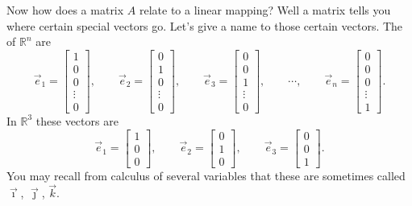 Now how does a matrix $A$ relate to a linear mapping?
Well a matrix tells you where
certain special vectors go.  Let's give a name to those certain vectors.
The \emph{} of ${\mathbb R}^n$ are
\begin{equation*}
\vec{e}_1 =
\begin{bmatrix}
1 \\ 0 \\ 0 \\ \vdots \\ 0
\end{bmatrix} ,
\qquad
\vec{e}_2 =
\begin{bmatrix}
0 \\ 1 \\ 0 \\ \vdots \\ 0
\end{bmatrix} ,
\qquad
\vec{e}_3 =
\begin{bmatrix}
0 \\ 0 \\ 1 \\ \vdots \\ 0
\end{bmatrix} ,
\qquad
\cdots ,
\qquad
\vec{e}_n =
\begin{bmatrix}
0 \\ 0 \\ 0 \\ \vdots \\ 1
\end{bmatrix} .
\end{equation*}
In ${\mathbb R}^3$ these vectors are
\begin{equation*}
\vec{e}_1 =
\begin{bmatrix}
1 \\ 0 \\ 0
\end{bmatrix} ,
\qquad
\vec{e}_2 =
\begin{bmatrix}
0 \\ 1 \\ 0
\end{bmatrix} ,
\qquad
\vec{e}_3 =
\begin{bmatrix}
0 \\ 0 \\ 1
\end{bmatrix} .
\end{equation*}
You may recall from calculus of several variables that these are
sometimes called $\vec{\imath}$, $\vec{\jmath}$, $\vec{k}$.

